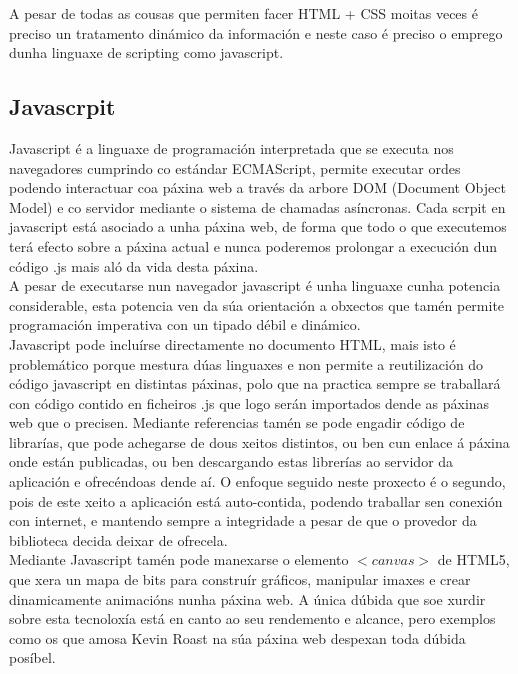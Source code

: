             A pesar de todas as cousas que permiten facer HTML + CSS moitas veces é preciso un 
            tratamento dinámico da información e neste caso é preciso o emprego dunha linguaxe de 
            scripting como javascript.
    
    \subsection{Javascrpit}
        Javascript é a linguaxe de programación interpretada que se executa nos navegadores
        cumprindo co estándar ECMAScript, permite executar ordes podendo interactuar coa páxina 
        web a través da arbore DOM (Document Object Model) e co servidor mediante o sistema de
        chamadas asíncronas. Cada scrpit en javascript está asociado a unha páxina web, de forma
        que todo o que executemos terá efecto sobre a páxina actual e nunca poderemos prolongar
        a execución dun código .js mais aló da vida desta páxina.\\
        
        A pesar de executarse nun navegador javascript é unha linguaxe cunha potencia 
        considerable, esta potencia ven da súa orientación a obxectos que tamén permite 
        programación imperativa con un tipado débil e dinámico.\\
        
        Javascript pode incluírse directamente no documento HTML, mais isto é problemático 
        porque mestura dúas linguaxes e non permite a reutilización do código javascript en
        distintas páxinas, polo que na practica sempre se traballará con código contido en
        ficheiros .js que logo serán importados dende as páxinas web que o precisen. Mediante 
        referencias tamén se pode engadir código de librarías, que pode achegarse de dous xeitos
        distintos, ou ben cun enlace á páxina onde están publicadas, ou ben descargando estas
        librerías ao servidor da aplicación e ofrecéndoas dende aí. O enfoque seguido neste 
        proxecto é o segundo, pois de este xeito a aplicación está auto-contida, podendo traballar
        sen conexión con internet, e mantendo sempre a integridade a pesar de que o provedor
        da biblioteca decida deixar de ofrecela.\\
        
        Mediante Javascript tamén pode manexarse o elemento $<canvas>$ de HTML5, que xera un mapa
        de bits para construír gráficos, manipular imaxes e crear dinamicamente animacións nunha
        páxina web. A única dúbida que soe xurdir sobre esta tecnoloxía está en canto ao seu 
        rendemento e alcance, pero exemplos como os que amosa Kevin Roast na súa páxina 
        web\cite{kevin-roast-canvas-examples} despexan toda dúbida posíbel.\\
        

